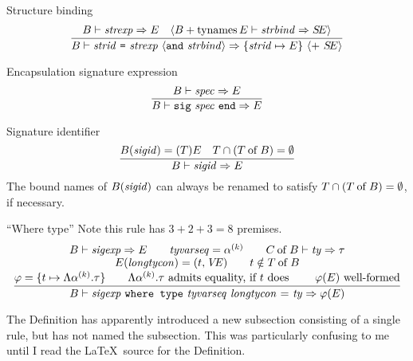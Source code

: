 
\begin{inference-rule}{Structure binding}
\begin{equation}\label{rule:static-modules:structure-binding}
  \vcenter{\infer{\B\ts\barestrbindera\ra\{\strid\mapsto\E\}
       \ \optional{ +\ \SE}}
    {\B\ts\strexp\ra\E
      & \optional{\plusmap{\B}{\TyNamesFcn\E}\ts\strbind\ra\SE}}}
\end{equation}
\end{inference-rule}


\begin{inference-rule}{Encapsulation signature expression}
\begin{equation}\label{rule:static-modules:encapsulating-sigexp}
  \vcenter{\infer{\B\ts\encsigexp\ra  \E}
    {\B\ts\spec\ra\E}}
\end{equation}
\end{inference-rule}

\begin{inference-rule}{Signature identifier}
\begin{equation}\label{rule:static-modules:signature-identifier}
  \vcenter{\infer{\B\ts\sigid\ra\E}
    {\B(\sigid) = (\T)\E
      & \T\cap (\of{\T}{\B}) = \emptyset}}
\end{equation}
The bound names of $B(\textit{sigid\/})$ can always be renamed to satisfy $T\cap(T \mathbin{\rm of} B) = \emptyset$,
if necessary.
\end{inference-rule}


\begin{inference-rule}{``Where type''}
Note this rule has $3+2+3=8$ premises.
\begin{equation}\label{rule:static-modules:where-type}
\vcenter{\infer{\B\ts\wheretypesigexp\ra\rea(\E)}
  {\deduce{\rea = \{\t\mapsto \Lambda\alphak.\tau\}\qquad
      \hbox{$\Lambda\alphak.\tau$ admits equality, if $\t$ does
        \qquad $\rea(\E)$ well-formed}}
    {\deduce{\E(\longtycon) = (\t, \VE)
        \qquad t\notin\of{\T}{\B}}
      {\B\ts\sigexp\ra \E
        \qquad \tyvarseq = \alphak
        \qquad \of{\C}{\B}\ts\ty\ra \tau}}}}
\end{equation}
\end{inference-rule}


\begin{danger}
The Definition has apparently introduced a new subsection consisting of
a single rule, but has not named the subsection. This was particularly
confusing to me until I read the \LaTeX\ source for the Definition.
\end{danger}

